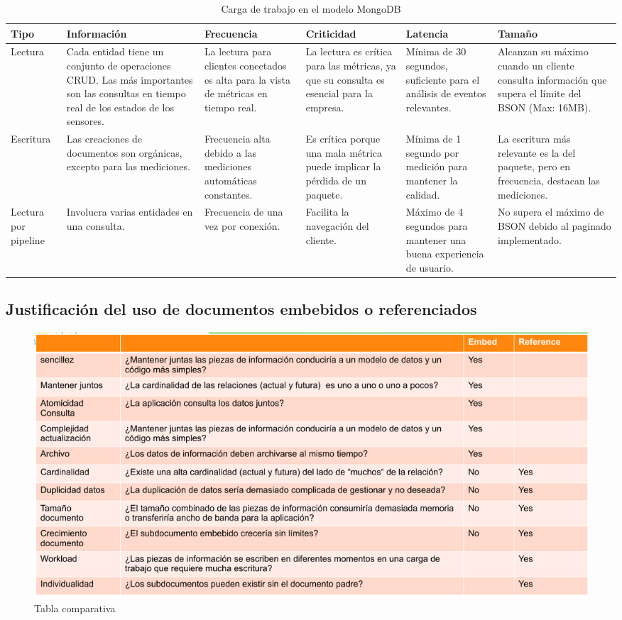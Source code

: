 \begin{table}[h!]
  \centering
  \renewcommand{\arraystretch}{2.5} %
  \begin{adjustbox}{width=\textwidth}
  \begin{tabular}{|p{2cm}|p{5cm}|p{3cm}|p{3cm}|p{3cm}|p{4cm}|}
  \hline
  \textbf{Tipo} & \textbf{Información} & \textbf{Frecuencia} & \textbf{Criticidad} & \textbf{Latencia} & \textbf{Tamaño} \\
  \hline
  Lectura & Cada entidad tiene un conjunto de operaciones CRUD. Las más importantes son las consultas en tiempo real de los estados de los sensores. & La lectura para clientes conectados es alta para la vista de métricas en tiempo real. & La lectura es crítica para las métricas, ya que su consulta es esencial para la empresa. & Mínima de 30 segundos, suficiente para el análisis de eventos relevantes. & Alcanzan su máximo cuando un cliente consulta información que supera el límite del BSON (Max: 16MB). \\
  \hline
  Escritura & Las creaciones de documentos son orgánicas, excepto para las mediciones. & Frecuencia alta debido a las mediciones automáticas constantes. & Es crítica porque una mala métrica puede implicar la pérdida de un paquete. & Mínima de 1 segundo por medición para mantener la calidad. & La escritura más relevante es la del paquete, pero en frecuencia, destacan las mediciones. \\
  \hline
  Lectura por pipeline & Involucra varias entidades en una consulta. & Frecuencia de una vez por conexión. & Facilita la navegación del cliente. & Máximo de 4 segundos para mantener una buena experiencia de usuario. & No supera el máximo de BSON debido al paginado implementado. \\
  \hline
  \end{tabular}
  \end{adjustbox}
  \caption{Carga de trabajo en el modelo MongoDB}
\end{table}

\subsection{Justificación del uso de documentos embebidos o referenciados}

\begin{figure}[H]
  \centering
  \includegraphics[width=\textwidth]{Figures/1. Content/Referenciado.png}
  \caption{Tabla comparativa}
  \label{fig:tabla_comparativa}
\end{figure}

